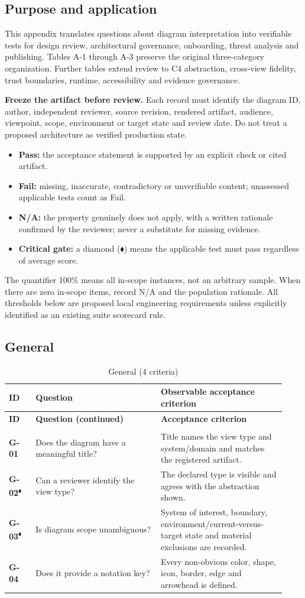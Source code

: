 \documentclass[10pt,letterpaper]{article}
\newcommand{\Gate}{\textsuperscript{\(\blacklozenge\)}}
\newcommand{\CheckRow}[3]{\textbf{\textsf{#1}} & #2 & #3\\[3pt]}
\newcommand{\ChecklistHeader}{\toprule
\textbf{ID} & \textbf{Question} & \textbf{Observable acceptance criterion}\\\midrule
\endfirsthead
\toprule\textbf{ID} & \textbf{Question (continued)} & \textbf{Acceptance criterion}\\\midrule
\endhead
\midrule\multicolumn{3}{r}{\footnotesize Continued on next page}\\\endfoot
\bottomrule\endlastfoot}
\begin{document}
\subsection{Purpose and application}
This appendix translates questions about diagram interpretation into verifiable tests for design review, architectural governance, onboarding, threat analysis and publishing. Tables A-1 through A-3 preserve the original three-category organization. Further tables extend review to C4 abstraction, cross-view fidelity, trust boundaries, runtime, accessibility and evidence governance.

\textbf{Freeze the artifact before review.} Each record must identify the diagram ID, author, independent reviewer, source revision, rendered artifact, audience, viewpoint, scope, environment or target state and review date. Do not treat a proposed architecture as verified production state.

\begin{itemize}
\item \textbf{Pass:} the acceptance statement is supported by an explicit check or cited artifact.
\item \textbf{Fail:} missing, inaccurate, contradictory or unverifiable content; unassessed applicable tests count as Fail.
\item \textbf{N/A:} the property genuinely does not apply, with a written rationale confirmed by the reviewer; never a substitute for missing evidence.
\item \textbf{Critical gate:} a diamond (\(\blacklozenge\)) means the applicable test must pass regardless of average score.
\end{itemize}
The quantifier 100\% means all in-scope instances, not an arbitrary sample. When there are zero in-scope items, record N/A and the population rationale. All thresholds below are proposed local engineering requirements unless explicitly identified as an existing suite scorecard rule.

\subsection{General}
\begin{longtable}{@{}>{\raggedright\arraybackslash}p{0.09\linewidth}>{\raggedright\arraybackslash}p{0.42\linewidth}>{\raggedright\arraybackslash}p{0.42\linewidth}@{}}
\caption{General (4 criteria)}\label{tab:review-G}\\
\ChecklistHeader
\CheckRow{G-01}{Does the diagram have a meaningful title?}{Title names the view type and system/domain and matches the registered artifact.}
\CheckRow{G-02\Gate}{Can a reviewer identify the view type?}{The declared type is visible and agrees with the abstraction shown.}
\CheckRow{G-03\Gate}{Is diagram scope unambiguous?}{System of interest, boundary, environment/current-versus-target state and material exclusions are recorded.}
\CheckRow{G-04}{Does it provide a notation key?}{Every non-obvious color, shape, icon, border, edge and arrowhead is defined.}
\end{longtable}
\end{document}
